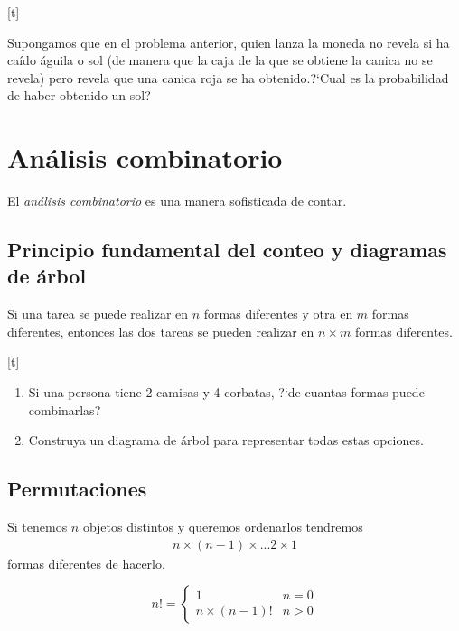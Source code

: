 [t]{}
 \begin{ejemplo}
  \label{exmp:0.1.s17}
	Supongamos que en el problema anterior, quien lanza la moneda no revela si ha caído águila o sol (de manera que la caja de la que se obtiene la canica no se revela) pero revela que una canica roja se ha obtenido.?`Cual es la probabilidad de haber obtenido un sol?
 \end{ejemplo}



\section{Análisis combinatorio}

{}
El \emph{análisis combinatorio} es una manera sofisticada de contar.


\subsection{Principio fundamental del conteo y diagramas de árbol}

Si una tarea se puede realizar en $n$ formas diferentes y otra en $m$ formas diferentes, entonces las dos tareas se pueden realizar en $n\times m$ formas diferentes.


[t]{}
\begin{ejemplo}
 \label{exmp:0.1.14}
\end{ejemplo}
 \begin{enumerate}
  \item Si una persona tiene 2 camisas y 4 corbatas, ?`de cuantas formas puede combinarlas?
  \item Construya un diagrama de árbol para representar todas estas opciones.
 \end{enumerate}



\subsection{Permutaciones}
{}
Si tenemos $n$ objetos distintos y queremos ordenarlos tendremos
\begin{align*}
n \times (n-1) \times ... 2\times 1
\end{align*} formas diferentes de hacerlo.

{}
\begin{defn}[$n$ factorial]
 \begin{equation}
n! = \begin{cases}
     1 & n=0 \\
     n\times(n-1)! & n>0
    \end{cases}
\end{equation}

\end{defn}


